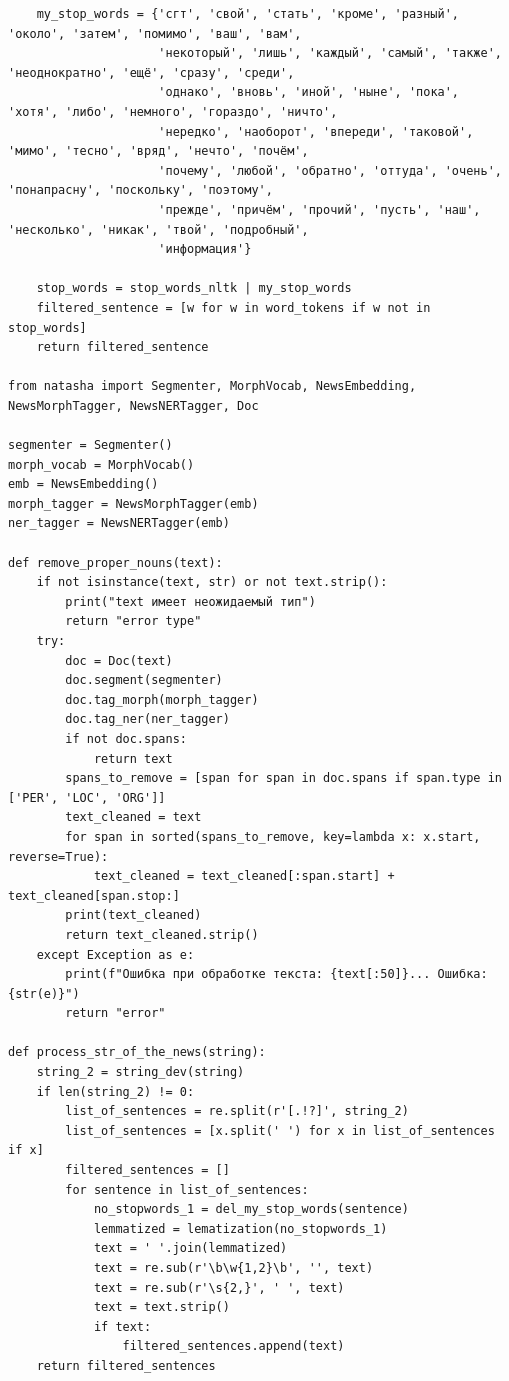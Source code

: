 \documentclass[coursework]{SCWorks}
\begin{document}
\begin{verbatim}
    my_stop_words = {'сгт', 'свой', 'стать', 'кроме', 'разный', 'около', 'затем', 'помимо', 'ваш', 'вам',
                     'некоторый', 'лишь', 'каждый', 'самый', 'также', 'неоднократно', 'ещё', 'сразу', 'среди',
                     'однако', 'вновь', 'иной', 'ныне', 'пока', 'хотя', 'либо', 'немного', 'гораздо', 'ничто',
                     'нередко', 'наоборот', 'впереди', 'таковой', 'мимо', 'тесно', 'вряд', 'нечто', 'почём',
                     'почему', 'любой', 'обратно', 'оттуда', 'очень', 'понапрасну', 'поскольку', 'поэтому',
                     'прежде', 'причём', 'прочий', 'пусть', 'наш', 'несколько', 'никак', 'твой', 'подробный',
                     'информация'}

    stop_words = stop_words_nltk | my_stop_words
    filtered_sentence = [w for w in word_tokens if w not in stop_words]
    return filtered_sentence

from natasha import Segmenter, MorphVocab, NewsEmbedding, NewsMorphTagger, NewsNERTagger, Doc

segmenter = Segmenter()
morph_vocab = MorphVocab()
emb = NewsEmbedding()
morph_tagger = NewsMorphTagger(emb)
ner_tagger = NewsNERTagger(emb)

def remove_proper_nouns(text):
    if not isinstance(text, str) or not text.strip():
        print("text имеет неожидаемый тип")
        return "error type"
    try:
        doc = Doc(text)
        doc.segment(segmenter)
        doc.tag_morph(morph_tagger)
        doc.tag_ner(ner_tagger)
        if not doc.spans:
            return text
        spans_to_remove = [span for span in doc.spans if span.type in ['PER', 'LOC', 'ORG']]
        text_cleaned = text
        for span in sorted(spans_to_remove, key=lambda x: x.start, reverse=True):
            text_cleaned = text_cleaned[:span.start] + text_cleaned[span.stop:]
        print(text_cleaned)
        return text_cleaned.strip()
    except Exception as e:
        print(f"Ошибка при обработке текста: {text[:50]}... Ошибка: {str(e)}")
        return "error"

def process_str_of_the_news(string):
    string_2 = string_dev(string)
    if len(string_2) != 0:
        list_of_sentences = re.split(r'[.!?]', string_2)
        list_of_sentences = [x.split(' ') for x in list_of_sentences if x]
        filtered_sentences = []
        for sentence in list_of_sentences:
            no_stopwords_1 = del_my_stop_words(sentence)
            lemmatized = lematization(no_stopwords_1)
            text = ' '.join(lemmatized)
            text = re.sub(r'\b\w{1,2}\b', '', text)
            text = re.sub(r'\s{2,}', ' ', text)
            text = text.strip()
            if text:
                filtered_sentences.append(text)
    return filtered_sentences


\end{verbatim}
\end{document}
